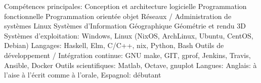 \begin{cvskills}
  \cvskill
    {Compétences principales:}
 	{
        Conception et architecture logicielle\newline
        Programmation fonctionnelle \newline
		Programmation orientée objet \newline
        Réseaux / Administration de systèmes Linux \newline
 	 	Systèmes d'Information Géographique \lastnewline
	 	Géométrie et rendu 3D
	}
  \cvskill
    {Systèmes d'exploitation:}
 	{Windows, Linux (NixOS, ArchLinux, Ubuntu, CentOS, Debian)}
  \cvskill
    {Langages:}
 	{Haskell, Elm, C/C++, nix, Python, Bash}
  \cvskill
	{Outils de développement / Intégration continue:}
	{GNU make, GIT, gprof, Jenkins, Travis, Ansible, Docker}
  \cvskill
	{Outils scientifiques:}
	{Matlab, Octave, gnuplot}
  \cvskill
    {Langues:}
 	{
        Anglais: à l'aise à l'écrit comme à l'orale,
        Espagnol: débutant
    }
\end{cvskills}

